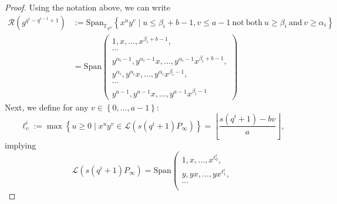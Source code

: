 \documentclass[a4paper]{article}
\theoremstyle{definition}
\theoremstyle{remark}
\newcommand{\calL}{\mathcal{L}}
\newcommand{\calR}{\mathcal{R}}
\newcommand{\fqm}{\mathbb{F}_{q^m}}
\newcommand{\set}[1]{\left\{#1\right\}}
\newcommand{\degab}[1]{\deg_{a,b}\left(#1\right)}
\begin{document}
\begin{proof}

Using the notation above, we can write
\begin{align*}
\calR\left(g^{q^i-q^{i-1}+1}\right) &:= \mathrm{Span}_{\fqm} \left\{x^uy^v \mid u \leq \beta_i+b-1 , v \leq a-1 \ \mathrm{not \ both} \ u \geq \beta_i \ \mathrm{and} \ v \geq \alpha_i\right\} \\
&= \mathrm{Span}    \left( \begin{array}{c}
         1,x,\dots,x^{\beta_i +b-1},   \\
         \cdots \\
         y^{\alpha_i -1},y^{\alpha_i -1}x,\dots,y^{\alpha_i -1}x^{\beta_i +b-1}, \\
          y^{\alpha_i},y^{\alpha_i}x,\dots,y^{\alpha_i}x^{\beta_i-1}, \\
         \cdots \\
         y^{a-1},y^{a-1}x,\dots,y^{a-1}x^{\beta_i-1}
    \end{array}
    \right)
\end{align*}
Next, we define for any $v \in \set{0,\dots,a-1}$:
$$\ell^i_v := \max \set{u \geq 0 \mid x^uy^v \in \calL(s(q^i+1)P_\infty)} = \left\lfloor \dfrac{s(q^i+1)-bv}{a}\right\rfloor,$$
implying
\begin{equation*}
\calL(s(q^i+1)P_\infty) = \mathrm{Span}    \left( \begin{array}{c}
         1,x,\dots,x^{\ell^i_0},   \\
         y,yx,\dots,yx^{\ell^i_1}, \\
         \cdots \\

\end{array}
\end{equation*}
\end{proof}
\end{document}
